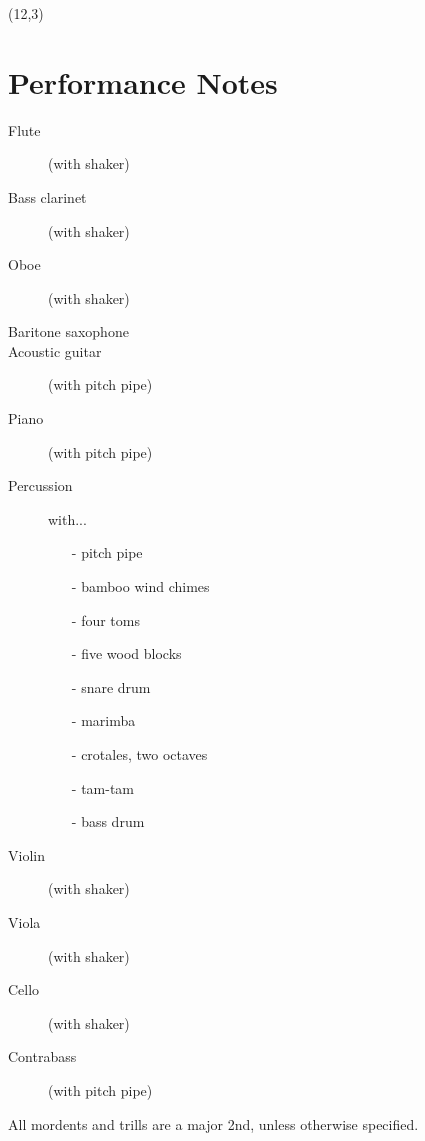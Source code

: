 \documentclass[10pt]{article}
\begin{document}
\begin{textblock}{11}(12,3)

\section{Performance Notes}

\begin{description}
    \item[Flute]
        (with shaker)
    \item[Bass clarinet]
        (with shaker)
    \item[Oboe]
        (with shaker)
    \item[Baritone saxophone]
    \item[Acoustic guitar]
        (with pitch pipe)
    \item[Piano]
        (with pitch pipe)
    \item[Percussion]
        with...
        \begin{itemize}
            \item[-] pitch pipe
            \item[-] bamboo wind chimes
            \item[-] four toms
            \item[-] five wood blocks
            \item[-] snare drum
            \item[-] marimba
            \item[-] crotales, two octaves
            \item[-] tam-tam
            \item[-] bass drum
        \end{itemize}
    \item[Violin]
        (with shaker)
    \item[Viola]
        (with shaker)
    \item[Cello]
        (with shaker)
    \item[Contrabass]
        (with pitch pipe)
\end{description}

All mordents and trills are a major 2nd, unless otherwise specified.

\end{textblock}
\end{document}
